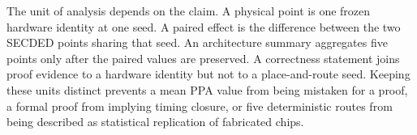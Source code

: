 The unit of analysis depends on the claim. A physical point is one frozen hardware identity at one seed. A paired effect is the difference between the two SECDED points sharing that seed. An architecture summary aggregates five points only after the paired values are preserved. A correctness statement joins proof evidence to a hardware identity but not to a place-and-route seed. Keeping these units distinct prevents a mean PPA value from being mistaken for a proof, a formal proof from implying timing closure, or five deterministic routes from being described as statistical replication of fabricated chips.
